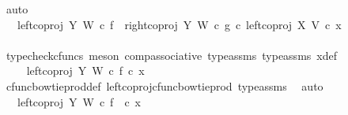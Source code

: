 \begin{isabellebody}
\ auto\isanewline
\ \ \ \ \ \ \ \ \ \ \isamarkupfalse%
\ \isamarkupfalse%
\ {\isachardoublequoteopen}{\isachardot}{\kern0pt}{\isachardot}{\kern0pt}{\isachardot}{\kern0pt}\ {\isacharequal}{\kern0pt}\ {\isacharparenleft}{\kern0pt}{\isacharparenleft}{\kern0pt}{\isacharparenleft}{\kern0pt}{\isacharparenleft}{\kern0pt}left{\isacharunderscore}{\kern0pt}coproj\ Y\ W{\isacharparenright}{\kern0pt}\ {\isasymcirc}\isactrlsub c\ f{\isacharparenright}{\kern0pt}\ {\isasymamalg}\ {\isacharparenleft}{\kern0pt}right{\isacharunderscore}{\kern0pt}coproj\ Y\ W\ {\isasymcirc}\isactrlsub c\ g{\isacharparenright}{\kern0pt}{\isacharparenright}{\kern0pt}\ {\isasymcirc}\isactrlsub c\ left{\isacharunderscore}{\kern0pt}coproj\ X\ V{\isacharparenright}{\kern0pt}\ {\isasymcirc}\isactrlsub c\ x{}{\isachardoublequoteclose}\isanewline
\ \ \ \ \ \ \ \ \ \ \ \ \isamarkupfalse%
\ {\isacharparenleft}{\kern0pt}typecheck{\isacharunderscore}{\kern0pt}cfuncs{\isacharcomma}{\kern0pt}\ meson\ comp{\isacharunderscore}{\kern0pt}associative{}\ type{\isacharunderscore}{\kern0pt}assms{\isacharparenleft}{\kern0pt}{}{\isacharparenright}{\kern0pt}\ type{\isacharunderscore}{\kern0pt}assms{\isacharparenleft}{\kern0pt}{}{\isacharparenright}{\kern0pt}\ x{}{\isacharunderscore}{\kern0pt}def{\isacharparenright}{\kern0pt}\isanewline
\ \ \ \ \ \ \ \ \ \ \isamarkupfalse%
\ \isamarkupfalse%
\ {\isachardoublequoteopen}{\isachardot}{\kern0pt}{\isachardot}{\kern0pt}{\isachardot}{\kern0pt}\ {\isacharequal}{\kern0pt}\ {\isacharparenleft}{\kern0pt}left{\isacharunderscore}{\kern0pt}coproj\ Y\ W\ {\isasymcirc}\isactrlsub c\ f{\isacharparenright}{\kern0pt}\ {\isasymcirc}\isactrlsub c\ x{}{\isachardoublequoteclose}\isanewline
\ \ \ \ \ \ \ \ \ \ \ \ \isamarkupfalse%
\ cfunc{\isacharunderscore}{\kern0pt}bowtie{\isacharunderscore}{\kern0pt}prod{\isacharunderscore}{\kern0pt}def{}\ left{\isacharunderscore}{\kern0pt}coproj{\isacharunderscore}{\kern0pt}cfunc{\isacharunderscore}{\kern0pt}bowtie{\isacharunderscore}{\kern0pt}prod\ type{\isacharunderscore}{\kern0pt}assms\ \isamarkupfalse%
\ auto\isanewline
\ \ \ \ \ \ \ \ \ \ \isamarkupfalse%
\ \isamarkupfalse%
\ {\isachardoublequoteopen}{\isachardot}{\kern0pt}{\isachardot}{\kern0pt}{\isachardot}{\kern0pt}\ {\isacharequal}{\kern0pt}\ left{\isacharunderscore}{\kern0pt}coproj\ Y\ W\ {\isasymcirc}\isactrlsub c\ f\ \ {\isasymcirc}\isactrlsub c\ x{}{\isachardoublequoteclose}\isanewline

\end{isabellebody}
